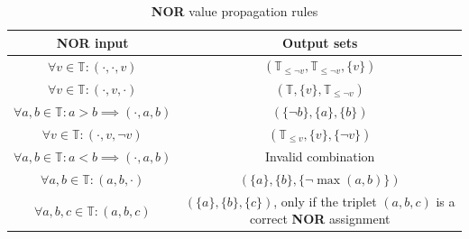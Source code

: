 \begin{table}[h!]
    \centering
    \begin{tabular}{|c|c|}
        \hline
        \rowcolor[HTML]{EAE1E1}
        {\color[HTML]{333333} \textbf{NOR input}}                  & {\color[HTML]{333333} \textbf{Output sets}}                                                  \\ \hline
        $\forall v \in \mathbb{T}: (\cdot, \cdot, v)$              & $(\mathbb{T}_{\leq \neg v},\mathbb{T}_{\leq \neg v}, \{v\} )$                                \\ \hline
        $\forall v \in \mathbb{T}: (\cdot, v, \cdot)$              & $(\mathbb{T}, \{v\}, \mathbb{T}_{\leq \neg v})$                                              \\ \hline
        $\forall a,b \in \mathbb{T}: a > b \implies (\cdot, a, b)$ & $(\{\neg b\}, \{a\}, \{b\})$                                                                 \\ \hline
        $\forall v \in \mathbb{T}: (\cdot, v, \neg v)$             & $(\mathbb{T}_{\leq v}, \{v\}, \{\neg v\})$                                                   \\ \hline
        $\forall a,b \in \mathbb{T}:a < b \implies (\cdot, a, b)$  & Invalid combination                                                                          \\ \hline
        $\forall a,b \in \mathbb{T}: (a, b, \cdot)$                & $(\{a\}, \{b\}, \{\neg \max(a,b) \})$                                                        \\ \hline
        $\forall a,b,c \in \mathbb{T}:  (a, b, c)$                 & $(\{a\}, \{b\}, \{c \})$, only if the triplet $(a,b,c)$ is a correct \textbf{NOR} assignment \\ \hline
    \end{tabular}
    \caption{\textbf{NOR} value propagation rules}
    \label{tab:chap-4:nor-propagation}
\end{table}

